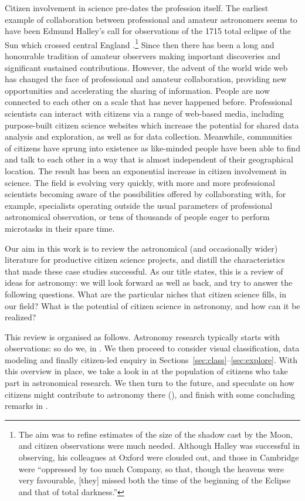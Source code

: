 \documentclass{ar2e}
\begin{document}
Citizen involvement in science pre-dates the profession itself. The earliest
example of collaboration between professional and amateur astronomers seems to
have been Edmund Halley's call for observations of the 1715 total eclipse of the
Sun which crossed central England \citep{Halley}.\footnote{The aim was to refine
estimates of the size of the shadow cast by the Moon, and citizen observations
were much needed. Although Halley was successful in observing, his colleagues at
Oxford were clouded out, and those in Cambridge were ``oppressed by too much
Company, so that, though the heavens were very favourable, [they] missed both
the time of the beginning of the Eclipse and that of total darkness.''}  Since
then there has been a long and honourable tradition of amateur observers
making important discoveries and significant sustained contributions. However,
the advent of the world wide web has changed the face of professional and
amateur collaboration, providing new opportunities and accelerating the sharing
of information. People are now connected to each other on a scale that has never
happened before. Professional scientists can interact with citizens via a range
of web-based media, including purpose-built citizen science websites which
increase the potential for shared data analysis and exploration, as well as for
data collection. Meanwhile, communities of citizens have sprung into existence
as like-minded people have been able to find and talk to each other in a way
that is almost independent of their geographical location. The result has been
an exponential increase in citizen involvement in science. The field is evolving
very quickly, with more and more professional scientists becoming aware of the
possibilities offered by collaborating with, for example, specialists operating
outside the usual parameters of professional astronomical observation, or tens
of thousands of people eager to perform microtasks in their spare time.  

Our aim in this work is to review the astronomical (and occasionally wider)
literature for productive citizen science projects, and distill the
characteristics that made these case studies successful.  As our title states,
this is a review of ideas for astronomy: we will look forward as well as back,
and try to answer the following questions. What are the particular niches that
citizen science fills, in our field? What is the potential of citizen science in
astronomy, and how can it be realized? 


This review is organised as follows. Astronomy research typically starts with
observations: so do we, in . We then proceed to consider visual
classification, data modeling and finally citizen-led enquiry in 
Sections~\ref{sec:class}--\ref{sec:explore}. With this overview in place, we
take a look in  at the population of citizens who take part in
astronomical research. We then turn to the future, and speculate on how citizens
might contribute to astronomy there (), and finish with some
concluding remarks in .
\end{document}
